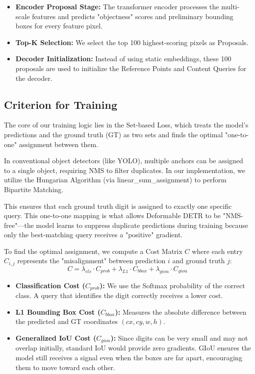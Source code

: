 \documentclass[a4paper]{article} %
\begin{document}
\begin{itemize}
    \item \textbf{Encoder Proposal Stage:} The transformer encoder processes the multi-scale features and predicts "objectness" scores and preliminary bounding boxes for every feature pixel.
    \item \textbf{Top-K Selection:} We select the top 100 highest-scoring pixels as Proposals.
    \item \textbf{Decoder Initialization:} Instead of using static embeddings, these 100 proposals are used to initialize the Reference Points and Content Queries for the decoder.
\end{itemize}
\subsection{Criterion for Training}

The core of our training logic lies in the Set-based Loss, which treats the model's predictions and the ground truth (GT) as two sets and finds the optimal "one-to-one" assignment between them.

In conventional object detectors (like YOLO), multiple anchors can be assigned to a single object, requiring NMS to filter duplicates. In our implementation, we utilize the Hungarian Algorithm (via linear\_sum\_assignment) to perform Bipartite Matching. \cite{criterion_github_ref}

This ensures that each ground truth digit is assigned to exactly one specific query. This one-to-one mapping is what allows Deformable DETR to be "NMS-free"—the model learns to suppress duplicate predictions during training because only the best-matching query receives a "positive" gradient.

To find the optimal assignment, we compute a Cost Matrix $C$ where each entry $C_{i,j}$ represents the "misalignment" between prediction $i$ and ground truth $j$:$$C = \lambda_{cls} \cdot C_{prob} + \lambda_{L1} \cdot C_{bbox} + \lambda_{giou} \cdot C_{giou}$$

\begin{itemize}
    \item \textbf{Classification Cost ($C_{prob}$):} We use the Softmax probability of the correct class. A query that identifies the digit correctly receives a lower cost.
    \item \textbf{L1 Bounding Box Cost ($C_{bbox}$):} Measures the absolute difference between the predicted and GT coordinates $(cx, cy, w, h)$.
    \item \textbf{Generalized IoU Cost ($C_{giou}$)\cite{giou_explanation}:} Since digits can be very small and may not overlap initially, standard IoU would provide zero gradients. GIoU ensures the model still receives a signal even when the boxes are far apart, encouraging them to move toward each other.
\end{itemize}
\end{document}
